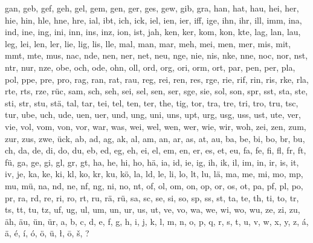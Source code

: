 gan, geb, gef, geh, gel, gem, gen, ger, ges, gew, gib, gra, han, hat, hau, hei, her, hie, hin, hle, hne, hre, ial, ibt, ich, ick, iel, ien, ier, iff, ige, ihn, ihr, ill, imm, ina, ind, ine, ing, ini, inn, ins, inz, ion, ist, jah, ken, ker, kom, kon, kte, lag, lan, lau, leg, lei, len, ler, lie, lig, lis, lle, mal, man, mar, meh, mei, men, mer, mis, mit, mmt, mte, mus, nac, nde, nen, ner, net, neu, nge, nie, nis, nke, nne, noc, nor, nst, ntr, nur, nze, obe, och, ode, ohn, oll, ord, org, ori, orm, ort, par, pen, per, pla, pol, ppe, pre, pro, rag, ran, rat, rau, reg, rei, ren, res, rge, rie, rif, rin, ris, rke, rla, rte, rts, rze, rüc, sam, sch, seh, sei, sel, sen, ser, sge, sie, sol, son, spr, sst, sta, ste, sti, str, stu, stä, tal, tar, tei, tel, ten, ter, the, tig, tor, tra, tre, tri, tro, tru, tsc, tur, ube, uch, ude, uen, uer, und, ung, uni, uns, upt, urg, usg, uss, ust, ute, ver, vie, vol, vom, von, vor, war, was, wei, wel, wen, wer, wie, wir, woh, zei, zen, zum, zur, zus, zwe, ück, ab, ad, ag, ak, al, am, an, ar, as, at, au, ba, be, bi, bo, br, bu, ch, da, de, di, do, du, eb, ed, eg, eh, ei, el, em, en, er, es, et, eu, fa, fe, fi, fl, fr, ft, fü, ga, ge, gi, gl, gr, gt, ha, he, hi, ho, hä, ia, id, ie, ig, ih, ik, il, im, in, ir, is, it, iv, je, ka, ke, ki, kl, ko, kr, ku, kö, la, ld, le, li, lo, lt, lu, lä, ma, me, mi, mo, mp, mu, mü, na, nd, ne, nf, ng, ni, no, nt, of, ol, om, on, op, or, os, ot, pa, pf, pl, po, pr, ra, rd, re, ri, ro, rt, ru, rä, rü, sa, sc, se, si, so, sp, ss, st, ta, te, th, ti, to, tr, ts, tt, tu, tz, uf, ug, ul, um, un, ur, us, ut, ve, vo, wa, we, wi, wo, wu, ze, zi, zu, äh, äu, ün, ür, a, b, c, d, e, f, g, h, i, j, k, l, m, n, o, p, q, r, s, t, u, v, w, x, y, z, á, ä, é, í, ó, ö, ü, ł, ō, š, ?

